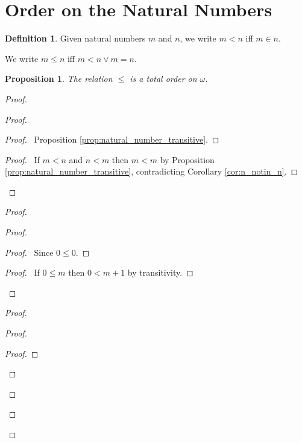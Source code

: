 \documentclass{report}
\newtheorem{prop}[ax]{Proposition}
\theoremstyle{definition}
\newtheorem{df}[ax]{Definition}
\begin{document}
\section{Order on the Natural Numbers}

\begin{df}
Given natural numbers $m$ and $n$, we write $m < n$ iff $m \in n$.

We write $m \leq n$ iff $m < n \vee m = n$.
\end{df}

\begin{prop}
The relation $\leq$ is a total order on $\omega$.
\end{prop}

\begin{proof}
\pf
{}
\begin{proof}
	\begin{proof}
		\pf\ Proposition \ref{prop:natural_number_transitive}.
	\end{proof}
	\begin{proof}
		\pf\ If $m < n$ and $n < m$ then $m < m$ by Proposition \ref{prop:natural_number_transitive}, contradicting Corollary \ref{cor:n_notin_n}.
	\end{proof}
	\qedstep
\end{proof}
\begin{proof}
	\begin{proof}
		\begin{proof}
			\pf\ Since $0 \leq 0$.
		\end{proof}
		\begin{proof}
			\pf\ If $0 \leq m$ then $0 < m+1$ by transitivity.
		\end{proof}
	\end{proof}
	\begin{proof}
		\begin{proof}
			\begin{proof}

\end{proof}
\end{proof}
\end{proof}
\end{proof}
\end{proof}
\end{document}
